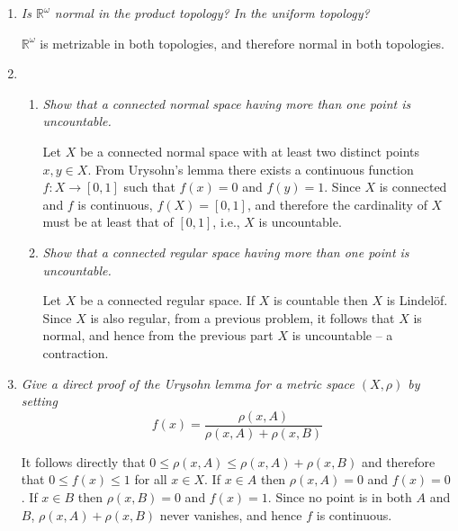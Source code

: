 \documentclass[10pt]{article}
\newcommand{\R}{\mathbb{R}}
\begin{document}
\begin{enumerate}
\item \emph{Is $\R^\omega$ normal in the product topology?  In the uniform topology?}

$\R^\omega$ is metrizable in both topologies, and therefore normal in both topologies.

\item
\begin{enumerate}
\item \emph{Show that a connected normal space having more than one point is uncountable.}

Let $X$ be a connected normal space with at least two distinct points $x,y \in X$.  From Urysohn's lemma there exists a continuous function $f: X \rightarrow [0,1]$ such that $f(x) = 0$ and $f(y) = 1$.  Since $X$ is connected and $f$ is continuous, $f(X) = [0,1]$, and therefore the cardinality of $X$ must be at least that of $[0,1]$, i.e., $X$ is uncountable.

\item \emph{Show that a connected regular space having more than one point is uncountable.}

Let $X$ be a connected regular space.  If $X$ is countable then $X$ is Lindel\"{o}f.  Since $X$ is also regular, from a previous problem, it follows that $X$ is normal, and hence from the previous part $X$ is uncountable -- a contraction.

\end{enumerate}

\item \emph{Give a direct proof of the Urysohn lemma for a metric space $(X,\rho)$ by setting $$f(x) = \frac{\rho(x,A)}{\rho(x,A) + \rho(x,B)}$$}

It follows directly that $0 \leq \rho(x,A) \leq \rho(x,A) + \rho(x,B)$ and therefore that $0 \leq f(x) \leq 1$ for all $x \in X$.  If $x \in A$ then $\rho(x,A) = 0$ and $f(x) = 0$.  If $x \in B$ then $\rho(x,B) = 0$ and $f(x) = 1$.  Since no point is in both $A$ and $B$, $\rho(x,A) + \rho(x,B)$ never vanishes, and hence $f$ is continuous.

\end{enumerate}
\end{document}
